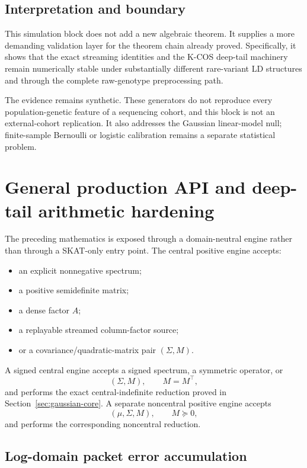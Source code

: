 \documentclass[11pt]{article}
\theoremstyle{definition}
\theoremstyle{remark}
\begin{document}
\subsection{Interpretation and boundary}

This simulation block does not add a new algebraic theorem.  It supplies a
more demanding validation layer for the theorem chain already proved.
Specifically, it shows that the exact streaming identities and the K-COS
deep-tail machinery remain numerically stable under substantially different
rare-variant LD structures and through the complete raw-genotype preprocessing
path.

The evidence remains synthetic.  These generators do not reproduce every
population-genetic feature of a sequencing cohort, and this block is not an
external-cohort replication.  It also addresses the Gaussian linear-model null;
finite-sample Bernoulli or logistic calibration remains a separate statistical
problem.


\section{General production API and deep-tail arithmetic hardening}\label{sec:final-25}

The preceding mathematics is exposed through a domain-neutral engine rather
than through a SKAT-only entry point.  The central positive engine accepts:

\begin{itemize}
\item an explicit nonnegative spectrum;
\item a positive semidefinite matrix;
\item a dense factor \(A\);
\item a replayable streamed column-factor source;
\item or a covariance/quadratic-matrix pair
\((\Sigma,M)\).
\end{itemize}

A signed central engine accepts a signed spectrum, a symmetric operator, or
\[
(\Sigma,M),\qquad M=M^\top,
\]
and performs the exact central-indefinite reduction proved in Section~\ref{sec:gaussian-core}.  A
separate noncentral positive engine accepts
\[
(\mu,\Sigma,M),\qquad M\succeq0,
\]
and performs the corresponding noncentral reduction.

\subsection{Log-domain packet error accumulation}
\end{document}

